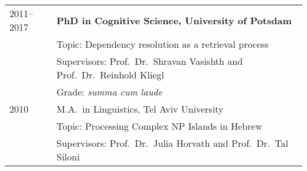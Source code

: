 \documentclass[]{article}
\begin{document}
\begin{longtable}[]{@{}ll@{}}
\toprule
\endhead
\begin{minipage}[t]{0.25\columnwidth}\raggedright
2011--2017\strut
\end{minipage} & \begin{minipage}[t]{0.69\columnwidth}\raggedright
\textbf{PhD in Cognitive Science, University of Potsdam}\strut
\end{minipage}\tabularnewline
\begin{minipage}[t]{0.25\columnwidth}\raggedright
\strut
\end{minipage} & \begin{minipage}[t]{0.69\columnwidth}\raggedright
Topic: Dependency resolution as a retrieval process\strut
\end{minipage}\tabularnewline
\begin{minipage}[t]{0.25\columnwidth}\raggedright
\strut
\end{minipage} & \begin{minipage}[t]{0.69\columnwidth}\raggedright
Supervisors: Prof.~Dr.~Shravan Vasishth and Prof.~Dr.~Reinhold
Kliegl\strut
\end{minipage}\tabularnewline
\begin{minipage}[t]{0.25\columnwidth}\raggedright
\strut
\end{minipage} & \begin{minipage}[t]{0.69\columnwidth}\raggedright
Grade: \emph{summa cum laude} \strut
\end{minipage}\tabularnewline
\begin{minipage}[t]{0.25\columnwidth}\raggedright
2010\strut
\end{minipage} & \begin{minipage}[t]{0.69\columnwidth}\raggedright
M.A.~in Linguistics, Tel Aviv University\strut
\end{minipage}\tabularnewline
\begin{minipage}[t]{0.25\columnwidth}\raggedright
\strut
\end{minipage} & \begin{minipage}[t]{0.69\columnwidth}\raggedright
Topic: Processing Complex NP Islands in Hebrew\strut
\end{minipage}\tabularnewline
\begin{minipage}[t]{0.25\columnwidth}\raggedright
\strut
\end{minipage} & \begin{minipage}[t]{0.69\columnwidth}\raggedright
Supervisors: Prof.~Dr.~Julia Horvath and Prof.~Dr.~Tal Siloni\strut

\end{minipage}
\end{longtable}
\end{document}
